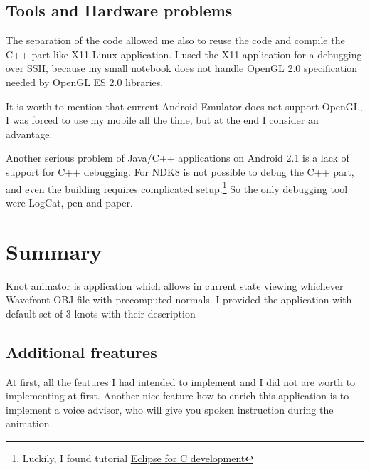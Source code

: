 \subsection*{Tools and Hardware problems} %
The separation of the code allowed me also to reuse the code and compile 
the C++ part like X11 Linux application. I used the X11 application for a debugging
over SSH, because my small notebook does not handle OpenGL 2.0 specification
needed by OpenGL ES 2.0 libraries.

It is worth to mention that current Android Emulator does not support OpenGL, 
I was forced to use my mobile all the time, 
but at the end I consider an advantage.

Another serious problem of Java/C++ applications on Android 2.1 is a lack of support for C++ debugging.
For NDK8 is not possible to debug the C++ part, 
and even the building requires complicated setup.\footnote{Luckily, I found tutorial \href{http://mhandroid.wordpress.com/2011/01/23/using-eclipse-for-android-cc-development/}{Eclipse for C development} }
So the only debugging tool were LogCat, pen and paper.

\section{Summary} %
\label{sec:Summary}
Knot animator is application which allows in current state viewing whichever Wavefront OBJ file
with precomputed normals. I provided the application with default set of 3 knots with their description

\subsection*{Additional freatures} %
\label{sec:Additional freatures}
At first, all the features I had intended to implement and I did not are worth to implementing at first.
Another nice feature how to enrich this application is to implement
a voice advisor, who will give you spoken instruction during the animation.

